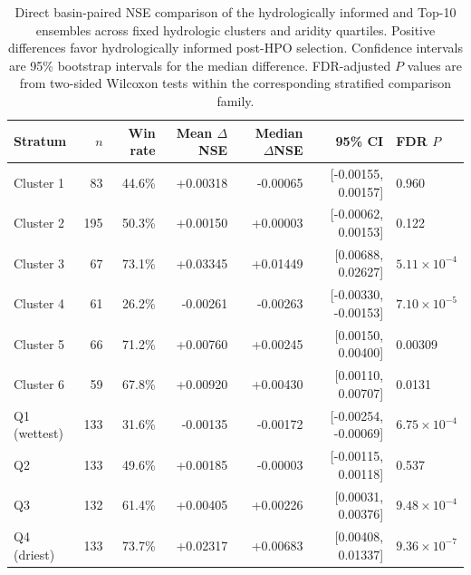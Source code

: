 \begin{table}[htbp]
\centering
\caption{Direct basin-paired NSE comparison of the hydrologically informed and Top-10 ensembles across fixed hydrologic clusters and aridity quartiles. Positive differences favor hydrologically informed post-HPO selection. Confidence intervals are 95\% bootstrap intervals for the median difference. FDR-adjusted $P$ values are from two-sided Wilcoxon tests within the corresponding stratified comparison family.}
\label{tab:hydro_selection_regimes}
\scriptsize
\renewcommand{\arraystretch}{1.12}
\setlength{\tabcolsep}{3.8pt}
\begin{tabular}{lrrrrrl}
\toprule
Stratum & $n$ & Win rate & Mean $\Delta$NSE & Median $\Delta$NSE & 95\% CI & FDR $P$ \\
\midrule
Cluster 1 & 83 & 44.6\% & +0.00318 & -0.00065 & [-0.00155, 0.00157] & 0.960 \\
Cluster 2 & 195 & 50.3\% & +0.00150 & +0.00003 & [-0.00062, 0.00153] & 0.122 \\
Cluster 3 & 67 & 73.1\% & +0.03345 & +0.01449 & [0.00688, 0.02627] & $5.11\times10^{-4}$ \\
Cluster 4 & 61 & 26.2\% & -0.00261 & -0.00263 & [-0.00330, -0.00153] & $7.10\times10^{-5}$ \\
Cluster 5 & 66 & 71.2\% & +0.00760 & +0.00245 & [0.00150, 0.00400] & 0.00309 \\
Cluster 6 & 59 & 67.8\% & +0.00920 & +0.00430 & [0.00110, 0.00707] & 0.0131 \\
\midrule
Q1 (wettest) & 133 & 31.6\% & -0.00135 & -0.00172 & [-0.00254, -0.00069] & $6.75\times10^{-4}$ \\
Q2 & 133 & 49.6\% & +0.00185 & -0.00003 & [-0.00115, 0.00118] & 0.537 \\
Q3 & 132 & 61.4\% & +0.00405 & +0.00226 & [0.00031, 0.00376] & $9.48\times10^{-4}$ \\
Q4 (driest) & 133 & 73.7\% & +0.02317 & +0.00683 & [0.00408, 0.01337] & $9.36\times10^{-7}$ \\
\bottomrule
\end{tabular}
\end{table}

